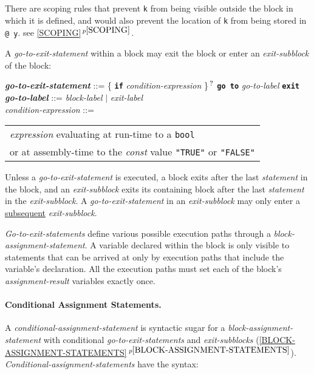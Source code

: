 \documentclass[12pt]{article}
\newcommand{\subsubsubsection}[1]{\paragraph[#1]{#1.}}
\newcommand{\TT}[1]{{\tt \bfseries #1}}
\newcommand{\QMARK}{{$^{\,\mbox{\footnotesize ?}}$}}
\newcommand{\ttkey}[1]{{\tt \bfseries #1}}
\newcommand{\emkey}[1]{{\em \bfseries #1}}
\newcommand{\itemref}[1]{\ref{#1}$\,^{p\pageref{#1}}$}
\newenvironment{indpar}[1][0.3in]%
	{\begin{list}{}%
		     {\setlength{\itemsep}{0in}%
		      \setlength{\topsep}{0in}%
		      \setlength{\parsep}{1ex}%
		      \setlength{\labelwidth}{#1}%
		      \setlength{\leftmargin}{#1}%
		      \addtolength{\leftmargin}{\labelsep}}%
	 \item}%
	{\end{list}}
\begin{document}
There are scoping rules that prevent {\tt k} from being visible
outside the block in which it is defined, and would also
prevent the location of {\tt k} from being stored in {\tt @ y}.
see \itemref{SCOPING}.

A {\em go-to-exit-statement} within a block may exit the block or
enter an {\em exit-subblock} of the block:
\begin{indpar}
\emkey{go-to-exit-statement}\label{GO-TO-STATEMENT} ::=
    \{ \TT{if} {\em condition-expression} \}\QMARK{}
    \ttkey{go to} {\em go-to-label} \TT{exit}
\\[0.5ex]
\emkey{go-to-label} ::= {\em block-label} $|$ {\em exit-label}
\\[0.5ex]
{\em condition-expression} ::=
    \begin{tabular}[t]{@{}l}
    {\em expression} evaluating at run-time to a {\tt bool} \\
    or at assembly-time to the {\em const} value {\tt "TRUE"} or {\tt "FALSE"}
    \end{tabular}
\end{indpar}

Unless a {\em go-to-exit-statement} is executed,
a block exits after the last {\em statement} in the block,
and an {\em exit-subblock} exits its containing block after the last
{\em statement} in the {\em exit-subblock}.
A {\em go-to-exit-statement} in an {\em exit-subblock} may only enter
a \underline{subsequent} {\em exit-subblock}.

{\em Go-to-exit-statements} define various possible execution
paths through a {\em block-assignment-statement}.
A variable declared within the block is only visible to statements that can be
arrived at only by execution paths that include the variable's
declaration.  All the execution paths must set each of the
block's {\em assignment-result} variables exactly once.


\subsubsubsection{Conditional Assignment Statements}
\label{CONDITIONAL-ASSIGNMENT-STATEMENTS}

A {\em conditional-assignment-statement}
is syntactic sugar for a {\em block-assignment-statement}
with conditional {\em go-to-exit-statements}
and {\em exit-subblocks} (\itemref{BLOCK-ASSIGNMENT-STATEMENTS}).
{\em Conditional-assignment-statements} have the syntax:
\end{document}
